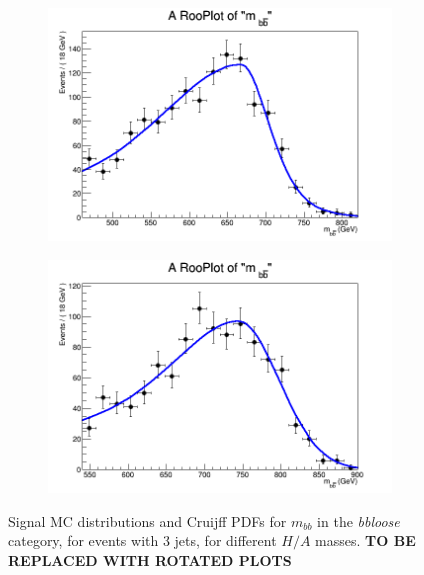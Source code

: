 \begin{figure}[phtb!]
\begin{center}
  \begin{subfigure}[$m_{A}=700$ GeV]{0.4\textwidth}\includegraphics[width=\textwidth]{FitResults/images/fitMC_bAbb700_4.png}\end{subfigure}
  \begin{subfigure}[$m_{A}=800$ GeV]{0.4\textwidth}\includegraphics[width=\textwidth]{FitResults/images/fitMC_bAbb800_4.png}\end{subfigure}
  \caption{Signal MC distributions and Cruijff PDFs for $m_{bb}$ in the {\it bbloose} category, for events with 3 jets, for different $H/A$ masses. \textbf{TO BE REPLACED WITH ROTATED PLOTS} \label{fig:signalPDFs_3j_bbloose}}
    \end{center}
\end{figure}


